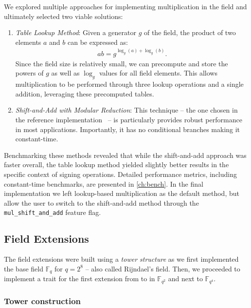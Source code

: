 \documentclass[11pt]{report}
\theoremstyle{definition}
\theoremstyle{plain}
\begin{document}
We explored multiple approaches for implementing multiplication in the field and ultimately selected two viable solutions:

\begin{enumerate}
  \item \textit{Table Lookup Method}: Given a generator $g$ of the field, the product of two elements $a$ and $b$ can be expressed as:
        \begin{align*}
          ab = g^{\log_g(a) + \log_g(b)}.
        \end{align*}
        Since the field size is relatively small, we can precompute and store the powers of $g$ as well as $\log_g$ values for all field elements. This allows multiplication to be performed through three lookup operations and a single addition, leveraging these precomputed tables.

  \item \textit{Shift-and-Add with Modular Reduction}: This technique -- the one chosen in the reference implementation~\cite{aguilarsyndrome11} -- is particularly provides robust performance in most applications. Importantly, it has no conditional branches making it constant-time.
\end{enumerate}

Benchmarking these methods revealed that while the shift-and-add approach was faster overall, the table lookup method yielded slightly better results in the specific context of signing operations. Detailed performance metrics, including constant-time benchmarks, are presented in \autoref{ch:bench}. In the final implementation we left lookup-based multiplication as the default method, but allow the user to switch to the shift-and-add method through the \texttt{mul\_shift\_and\_add} feature flag.

\subsection{Field Extensions}\label{sub:field_extensions}
The field extensions were built using a \textit{tower structure} as we first implemented the base field $\mathbb{F}_{q}$ for $q=2^8$ -- also called Rijndael's field. Then, we proceeded to implement a trait for the first extension from  to \rust{[u8; 2]} in $\mathbb{F}_{q^2}$ and next to $\mathbb{F}_{q^4}$.

\subsubsection{Tower construction}
\end{document}
